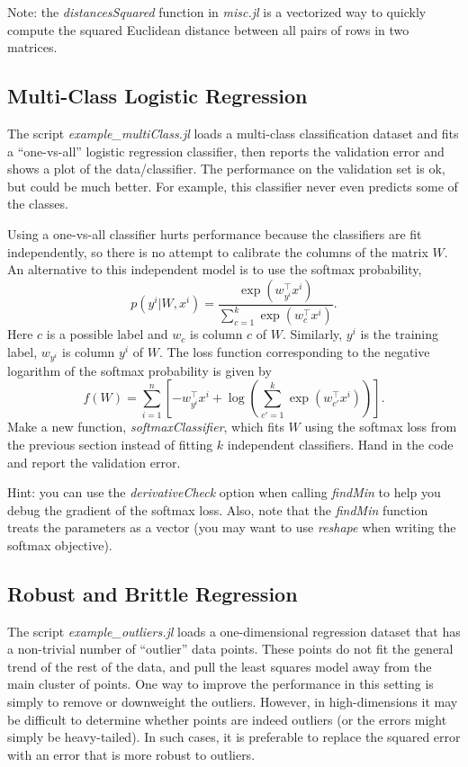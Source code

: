 \documentclass{article}
\def\blu#1{{\color{blu}#1}}
\begin{document}
Note:  the \emph{distancesSquared} function in \emph{misc.jl} is a vectorized way to quickly compute the squared Euclidean distance between all pairs of rows in two matrices.




\subsection{Multi-Class Logistic Regression}


The script \emph{example\_multiClass.jl} loads a multi-class classification dataset and fits a ``one-vs-all'' logistic regression classifier, then reports the validation error and shows a plot of the data/classifier. The performance on the validation set is ok, but could be much better. For example, this classifier never even predicts some of the classes.

Using a one-vs-all classifier hurts performance because the classifiers are fit independently, so there is no attempt to calibrate the columns of the matrix $W$. An alternative to this independent model is to use the softmax probability,
\[
p(y^i | W, x^i) = \frac{\exp(w_{y^i}^\top x^i)}{\sum_{c=1}^k\exp(w_c^\top x^i)}.
\]
Here $c$ is a possible label and $w_{c}$ is column $c$ of $W$. Similarly, $y^i$ is the training label, $w_{y^i}$ is column $y^i$ of $W$. The loss function corresponding to the negative logarithm of the softmax probability is given by
\[
f(W) = \sum_{i=1}^n \left[-w_{y^i}^\top x^i + \log\left(\sum_{c' = 1}^k \exp(w_{c'}^\top x^i)\right)\right].
\]
Make a new function, \emph{softmaxClassifier}, which fits $W$ using the softmax loss from the previous section  instead of fitting $k$ independent classifiers. \blu{Hand in the code and report the validation error}.

Hint: you can use the \emph{derivativeCheck} option when calling \emph{findMin} to help you debug the gradient of the softmax loss. Also, note that the \emph{findMin} function treats the parameters as a vector (you may want to use \emph{reshape} when writing the softmax objective).




\subsection{Robust and Brittle Regression}


The script \emph{example\_outliers.jl} loads a one-dimensional regression dataset that has a non-trivial number of ``outlier'' data points. These points do not fit the general trend of the rest of the data, and pull the least squares model away from the main cluster of points. One way to improve the performance in this setting is simply to remove or downweight the outliers. However, in high-dimensions it may be difficult to determine whether points are indeed outliers (or the errors might simply be heavy-tailed). In such cases, it is preferable to replace the squared error with an error that is more robust to outliers. 
\end{document}
